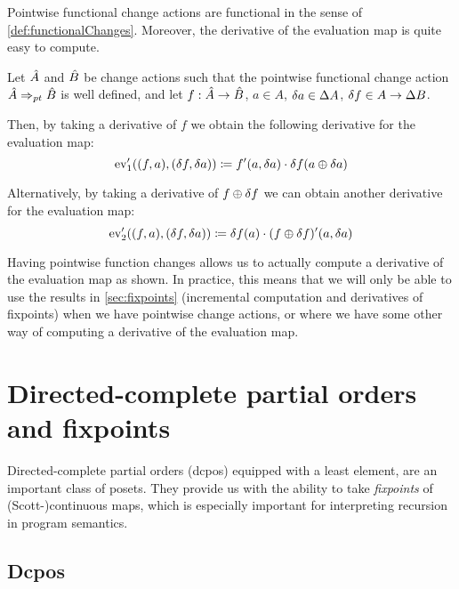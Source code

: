 Pointwise functional change actions are functional in the sense of \cref{def:functionalChanges}. 
Moreover, the derivative of the evaluation map is quite easy to compute. 
\begin{prop}
\label{prop:evDerivatives}
  Let $\hat{A}$ and $\hat{B}$ be change actions such that the pointwise functional change action
  $\hat{A} \Rightarrow_{pt} \hat{B}$ is well defined, and let
  $f: \hat{A} \rightarrow \hat{B}$,
  $a \in A$, $\delta a \in \Delta A$,
  $\delta f \in A \rightarrow \Delta B$.

  Then, by taking a derivative of $f$ we obtain the following derivative for the evaluation map:
  \begin{displaymath}
    \operatorname{ev}'_1((f, a), (\delta f, \delta a)) 
    \coloneqq f'(a, \delta a) \cdot \delta f(a \oplus \delta a)
  \end{displaymath}

  Alternatively, by taking a derivative of $f \oplus \delta f$ we can obtain another derivative
  for the evaluation map:
  \begin{displaymath}
    \operatorname{ev}'_2((f, a), (\delta f, \delta a)) 
    \coloneqq \delta f(a) \cdot (f \oplus \delta f)'(a, \delta a)
  \end{displaymath}
\end{prop}

Having pointwise function changes allows us to actually compute a derivative of the
evaluation map as shown. In practice, this means
that we will only be able to use the results in \cref{sec:fixpoints}
(incremental computation and derivatives of fixpoints) when
we have pointwise change actions, or where we have some other way of computing
a derivative of the evaluation map. 

\section{Directed-complete partial orders and fixpoints}

Directed-complete partial orders (dcpos) equipped with a least element, are an
important class of posets. They provide us with the ability to take
\emph{fixpoints} of (Scott-)continuous maps, which is especially important for interpreting recursion in program semantics.

\subsection{Dcpos}
\label{sec:dcpos}

